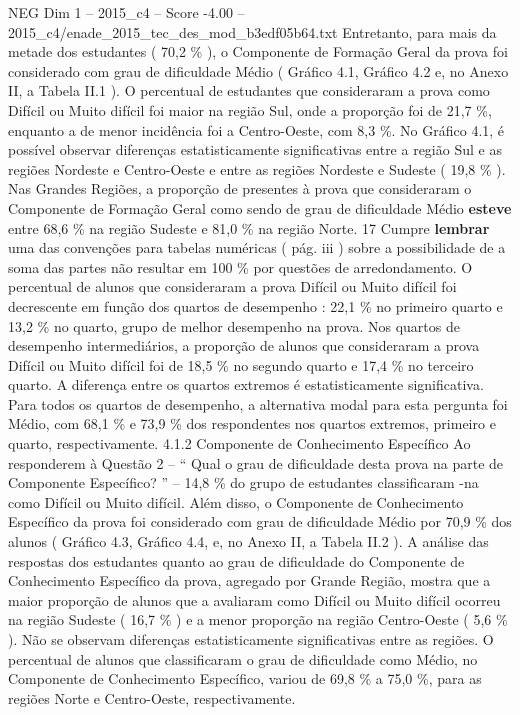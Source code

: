 \begin{textsample}{NEG Dim 1 – 2015\_c4 – Score -4.00 – 2015\_c4/enade\_2015\_tec\_des\_mod\_b3edf05b64.txt}
Entretanto, para mais da metade dos estudantes ( 70,2 \% ), o Componente de Formação Geral da prova foi considerado com grau de dificuldade Médio ( Gráfico 4.1, Gráfico 4.2 e, no Anexo II, a Tabela II.1 ).
O percentual de estudantes que consideraram a prova como Difícil ou Muito difícil foi maior na região Sul, onde a proporção foi de 21,7 \%, enquanto a de menor incidência foi a Centro-Oeste, com 8,3 \%.
No Gráfico 4.1, é possível observar diferenças estatisticamente significativas entre a região Sul e as regiões Nordeste e Centro-Oeste e entre as regiões Nordeste e Sudeste ( 19,8 \% ).
Nas Grandes Regiões, a proporção de presentes à prova que consideraram o Componente de Formação Geral como sendo de grau de dificuldade Médio \textbf{esteve} entre 68,6 \% na região Sudeste e 81,0 \% na região Norte. 17 Cumpre \textbf{lembrar} uma das convenções para tabelas numéricas ( pág. iii ) sobre a possibilidade de a soma das partes não resultar em 100 \% por questões de arredondamento.
O percentual de alunos que consideraram a prova Difícil ou Muito difícil foi decrescente em função dos quartos de desempenho : 22,1 \% no primeiro quarto e 13,2 \% no quarto, grupo de melhor desempenho na prova.
Nos quartos de desempenho intermediários, a proporção de alunos que consideraram a prova Difícil ou Muito difícil foi de 18,5 \% no segundo quarto e 17,4 \% no terceiro quarto.
A diferença entre os quartos extremos é estatisticamente significativa.
Para todos os quartos de desempenho, a alternativa modal para esta pergunta foi Médio, com 68,1 \% e 73,9 \% dos respondentes nos quartos extremos, primeiro e quarto, respectivamente. 4.1.2 Componente de Conhecimento Específico Ao responderem à Questão 2 – “ Qual o grau de dificuldade desta prova na parte de Componente Específico? ” – 14,8 \% do grupo de estudantes classificaram -na como Difícil ou Muito difícil.
Além disso, o Componente de Conhecimento Específico da prova foi considerado com grau de dificuldade Médio por 70,9 \% dos alunos ( Gráfico 4.3, Gráfico 4.4, e, no Anexo II, a Tabela II.2 ).
A análise das respostas dos estudantes quanto ao grau de dificuldade do Componente de Conhecimento Específico da prova, agregado por Grande Região, mostra que a maior proporção de alunos que a avaliaram como Difícil ou Muito difícil ocorreu na região Sudeste ( 16,7 \% ) e a menor proporção na região Centro-Oeste ( 5,6 \% ).
Não se observam diferenças estatisticamente significativas entre as regiões.
O percentual de alunos que classificaram o grau de dificuldade como Médio, no Componente de Conhecimento Específico, variou de 69,8 \% a 75,0 \%, para as regiões Norte e Centro-Oeste, respectivamente.

\end{textsample}

